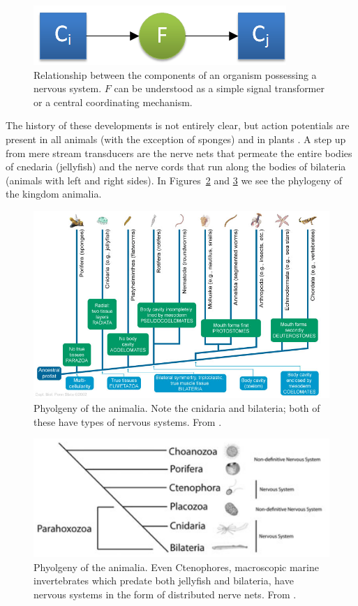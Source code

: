 \begin{figure}
	\centering
	\includegraphics{figs/nervousSystem.png}
	\caption{Relationship between the components of an organism possessing a nervous system. $F$ can be understood as a simple signal transformer or a central coordinating mechanism.}
	\label{fig:nervousSystem}
\end{figure}

The history of these developments is not entirely clear, but action potentials are present in all animals (with the exception of sponges) and in plants \cite{Leys01051999, PCE:PCE1614}. 
A step up from mere stream transducers are the nerve nets that permeate the entire bodies of cnedaria (jellyfish) and the nerve cords that run along the bodies of bilateria (animals with left and right sides). In Figures~\ref{fig:animalia} and \ref{fig:animalia2} we see the phylogeny of the kingdom animalia.

\begin{figure}
	\centering
	\includegraphics[width=\textwidth]{Figs/animalia.jpg}
	\caption{Phyolgeny of the animalia. Note the cnidaria and bilateria; both of these have types of nervous systems. From \cite{animalia}.}
	\label{fig:animalia}
\end{figure}

\begin{figure}
	\centering
	\includegraphics[width=\textwidth]{Figs/animalia2.png}
	\caption{Phyolgeny of the animalia. Even Ctenophores, macroscopic marine invertebrates which predate both jellyfish and bilateria, have nervous systems in the form of distributed nerve nets. From \cite{animalia2}.}
	\label{fig:animalia2}
\end{figure}

